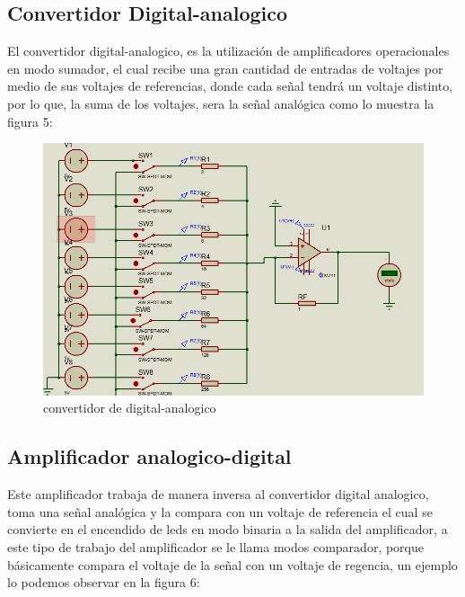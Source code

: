 \documentclass[11pt,a4paper]{article}
\begin{document}
\subsection{Convertidor Digital-analogico}

El convertidor digital-analogico, es la utilización de amplificadores operacionales en modo sumador, el cual recibe una gran cantidad de entradas de voltajes por medio de sus voltajes de referencias, donde cada señal tendrá un voltaje distinto, por lo que, la suma de los voltajes, sera la señal analógica como lo muestra la figura 5:

\begin{figure}[ht]
\begin{center}
\includegraphics[scale=0.5]{10.PNG}
\caption{convertidor de digital-analogico}
\end{center}
\end{figure}


\subsection{Amplificador analogico-digital}

Este amplificador trabaja de manera inversa al convertidor digital analogico, toma una señal analógica y la compara con un voltaje de referencia el cual se convierte en el encendido de leds en modo binaria a la salida del amplificador, a este tipo de trabajo del amplificador se le llama modos comparador, porque básicamente compara el voltaje de la señal con un voltaje de regencia, un ejemplo lo podemos observar en la figura 6:
\end{document}
